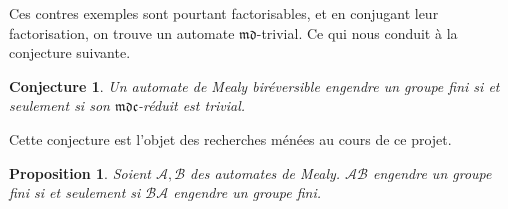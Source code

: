 \documentclass[11pt,a4paper]{article}
\newtheorem{prop}{Proposition}
\newtheorem{conj}{Conjecture}
\begin{document}
Ces contres exemples sont pourtant factorisables, et en conjugant leur factorisation, on trouve un automate $\mathfrak{md}$-trivial. Ce qui nous conduit à la conjecture suivante.

\begin{conj}
  \label{conj:birev-mdc}
  Un automate de Mealy biréversible engendre un groupe fini si et seulement si son $\mathfrak{mdc}$-réduit est trivial.
\end{conj}

Cette conjecture est l'objet des recherches ménées au cours de ce projet.

\begin{prop}
  \label{prop:finitude-c}
  Soient $\mathcal{A}, \mathcal{B}$ des automates de Mealy.
  $\mathcal{A}\mathcal{B}$ engendre un groupe fini si et seulement si $\mathcal{B}\mathcal{A}$ engendre un groupe fini.
\end{prop}
\end{document}

